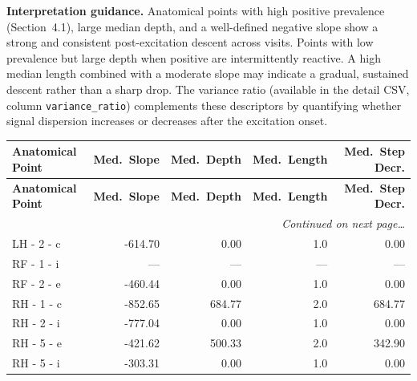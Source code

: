 \documentclass[a4paper,11pt]{article}
\begin{document}
\medskip
\noindent\textbf{Interpretation guidance.}
Anatomical points with high positive prevalence (Section~4.1), large median depth, and a
well-defined negative slope show a strong and consistent post-excitation descent across
visits.
Points with low prevalence but large depth when positive are intermittently reactive.
A high median length combined with a moderate slope may indicate a gradual, sustained
descent rather than a sharp drop.
The variance ratio (available in the detail CSV, column \texttt{variance\_ratio}) complements
these descriptors by quantifying whether signal dispersion increases or decreases after the
excitation onset.

\begin{small}
\begin{longtable}{p{4.5cm}rrrr}
\toprule
\textbf{Anatomical Point} &
\textbf{Med.\ Slope} &
\textbf{Med.\ Depth} &
\textbf{Med.\ Length} &
\textbf{Med.\ Step Decr.} \\
\midrule
\endfirsthead
\toprule
\textbf{Anatomical Point} &
\textbf{Med.\ Slope} &
\textbf{Med.\ Depth} &
\textbf{Med.\ Length} &
\textbf{Med.\ Step Decr.} \\
\midrule
\endhead
\midrule
\multicolumn{5}{r}{\small\emph{Continued on next page\ldots}} \\
\endfoot
\bottomrule
\endlastfoot
LH - 2 - c & -614.70 & 0.00 & 1.0 & 0.00 \\
RF - 1 - i & --- & --- & --- & --- \\
RF - 2 - e & -460.44 & 0.00 & 1.0 & 0.00 \\
RH - 1 - c & -852.65 & 684.77 & 2.0 & 684.77 \\
RH - 2 - i & -777.04 & 0.00 & 1.0 & 0.00 \\
RH - 5 - e & -421.62 & 500.33 & 2.0 & 342.90 \\
RH - 5 - i & -303.31 & 0.00 & 1.0 & 0.00 \\
\end{longtable}
\end{small}
\end{document}
